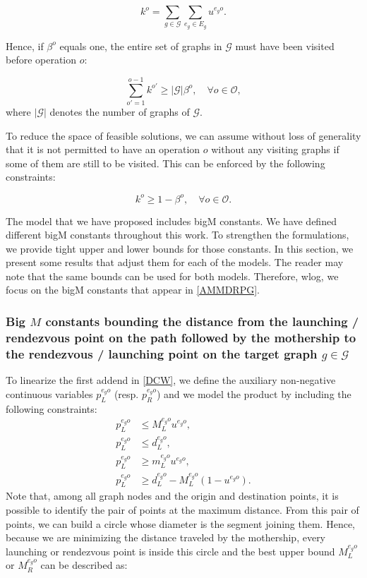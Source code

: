 \documentclass[10pt,a4paper]{elsarticle}
\newcommand{\EN}[1]{{\color{black}#1}}
\begin{document}
$$k^o=\sum_{g\in\mathcal G}\sum_{e_g\in E_g} u^{e_go}.$$

\noindent
Hence, if $\beta^o$ equals one, the entire set of graphs in $\mathcal G$ must have been visited before operation $o$:

\begin{equation}\tag{VI-1}\label{eq:VI-1}
\sum_{o'=1}^{o-1} k^{o'} \geq |\mathcal G|\beta^o, \quad\forall o\in\mathcal{O},
\end{equation}
where $|\mathcal G|$ denotes the number of graphs of $\mathcal G$.

\noindent
To reduce the space of feasible solutions, we can assume without loss of generality that it is not permitted to have an operation $o$ without any visiting graphs if some of them are still to be visited. This can be enforced by the following constraints:

\begin{equation}\tag{VI-2}\label{eq:VI-2}
k^o \geq 1 - \beta^o, \quad\forall o\in\mathcal{O}.
\end{equation}

\noindent
The model that we have proposed includes bigM constants. We have defined different bigM constants \EN{throughout} this work. To strengthen the formulations, we provide tight upper and lower bounds for those constants. In this section, we present some results that adjust them for each of the models. The reader may note that the same bounds can be used for both models. Therefore, wlog, we focus on the bigM constants that appear in \eqref{AMMDRPG}.


\subsubsection*{Big $M$ constants bounding the distance from the launching / rendezvous point on the path followed by the mothership to the rendezvous / launching point on the target graph $g\in \mathcal{G}$}


\noindent
To linearize the first addend in \eqref{DCW}, we define the auxiliary non-negative continuous variables $p_L^{e_go}$ (resp. $p_R^{e_go}$) and we model the product by including the following constraints:
\begin{align*}
p_L^{e_go} & \leq  M_L^{e_go}u^{e_go},\\
p_L^{e_go} & \leq d_L^{e_go}, \\
p_L^{e_go} & \geq m_L^{e_go} u^{e_go}, \\
p_L^{e_go} & \geq d_L^{e_go} - M_L^{e_go}(1-u^{e_go}).
\end{align*}
Note that, among all graph nodes and the origin and destination points, it is possible to identify the pair of points at the maximum distance. From this pair of points, we can build a circle whose diameter is the segment joining them. Hence, because we are minimizing the distance traveled by the mothership, every launching  or rendezvous point is inside this circle and the best upper bound $M_L^{e_go}$ or $M_R^{e_go}$ can be described as:
\end{document}
